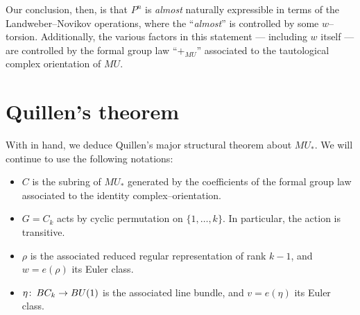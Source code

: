 Our conclusion, then, is that $P^n$ is \emph{almost} naturally expressible in terms of the Landweber--Novikov operations, where the ``\emph{almost}'' is controlled by some $w$--torsion.  Additionally, the various factors in this statement --- including $w$ itself --- are controlled by the formal group law ``$+_{MU}$'' associated to the tautological complex orientation of $MU$.

\begin{remark}
\end{remark}










\section{Quillen's theorem}

With  in hand, we deduce Quillen's major structural theorem about $MU_*$.  We will continue to use the following notations:
\begin{itemize}
\item $C$ is the subring of $MU_*$ generated by the coefficients of the formal group law associated to the identity complex--orientation.
\item $G = C_k$ acts by cyclic permutation on $\{1, \ldots, k\}$.  In particular, the action is transitive.
\item $\rho$ is the associated reduced regular representation of rank $k-1$, and $w = e(\rho)$ its Euler class.
\item $\eta\colon\thinspace BC_k \to BU(1)$ is the associated line bundle, and $v = e(\eta)$ its Euler class.
\end{itemize}

